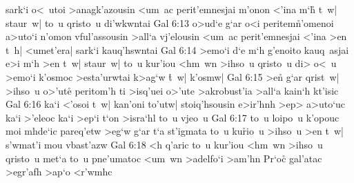 sark`i
o<~utoi
>anagk'azousin
<um~ac
perit'emnesjai
m'onon
<'ina
m`h\r{}
t~w|
staur~w|
to~u
qristo~u
di'wkwntai\bibvsend
\vs Gal 6:13
o>ud`e
g`ar
o<i
peritem\r{n}'omenoi
a>uto`i
n'omon
vful'assousin
>all`a
vj'elousin
<um~ac
perit'emnesjai
<'ina
>en
t~h|
<umet'era|
sark`i
kauq'hswntai\bibvsend
\vs Gal 6:14
>emo`i
d`e
m`h
g'enoito
kauq~asjai
e>i
m`h
>en
t~w|
staur~w|
to~u
kur'iou
<hm~wn
>ihso~u
qristo~u
di>
o<~u
>emo`i
k'osmoc
>esta'urwtai
k>ag`w
\r{t}~w|
k'osmw|\bibvsend
\vs Gal 6:15
>e\r{n}
g`ar
qrist~w|
>ihso~u
o>'ute\r{}
peritom'h
ti
>isq'uei
o>'ute
>akrobust'ia
>all`a
kain`h
kt'isic\bibvsend
\vs Gal 6:16
ka`i
<'osoi
t~w|
kan'oni
to'utw|
stoiq'hsousin
e>ir'hnh
>ep>
a>uto`uc
ka`i
>'eleoc
ka`i
>ep`i
t`on
>isra`hl
to~u
vjeo~u\bibvsend
\vs Gal 6:17
to~u
loipo~u
k'opouc
moi
mhde`ic
pareq'etw
>eg`w
g`ar
t`a
st'igmata
to~u
ku\r{r}io~u
>ihso~u
>en
t~w|
s'wmat'i
mou
vbast'azw\bibvsend
\vs Gal 6:18
<h
q'aric
to~u
kur'iou
<hm~wn
>ihso~u
qristo~u
met`a
to~u
pne'umatoc
<um~wn
>adelfo`i
>am'hn\bibvsend
Pr`oc\r{}
gal'atac
>egr'afh
>ap`o
<r'wmhc\bibvsend
